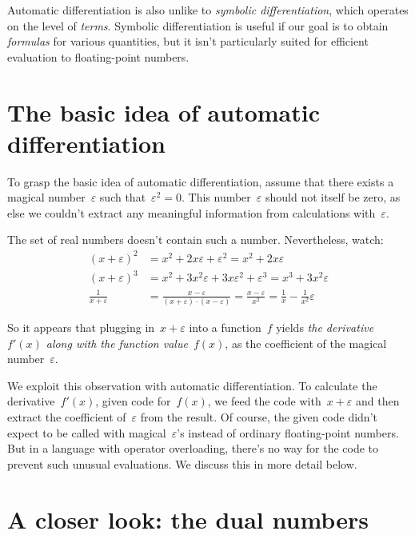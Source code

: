\documentclass[a4paper,ngerman,12pt]{scrartcl}
\theoremstyle{definition}
\theoremstyle{plain}
\theoremstyle{remark}
\begin{document}
Automatic differentiation is also unlike to \emph{symbolic differentiation},
which operates on the level of \emph{terms}. Symbolic differentiation is useful
if our goal is to obtain \emph{formulas} for various quantities, but it isn't
particularly suited for efficient evaluation to floating-point numbers.


\section{The basic idea of automatic differentiation}

To grasp the basic idea of automatic differentiation, assume that there exists
a magical number~$\varepsilon$ such that~$\varepsilon^2 = 0$. This
number~$\varepsilon$ should not itself be zero, as else we couldn't extract any
meaningful information from calculations with~$\varepsilon$.

The set of real numbers doesn't contain such a number. Nevertheless, watch:
\begin{align*}
  (x+\varepsilon)^2 &= x^2 + 2x\varepsilon + \varepsilon^2 = x^2 + 2x\varepsilon \\
  (x+\varepsilon)^3 &= x^2 + 3x^2\varepsilon + 3x\varepsilon^2 + \varepsilon^3 = x^3 + 3x^2\varepsilon \\
  \frac{1}{x+\varepsilon} &= \frac{x-\varepsilon}{(x+\varepsilon) \cdot
  (x-\varepsilon)} = \frac{x-\varepsilon}{x^2} = \frac{1}{x} - \frac{1}{x^2}
  \varepsilon
\end{align*}

So it appears that plugging in~$x + \varepsilon$ into a function~$f$ yields
\emph{the derivative~$f'(x)$ along with the function value~$f(x)$}, as the
coefficient of the magical number~$\varepsilon$.

We exploit this observation with automatic differentiation. To calculate the
derivative~$f'(x)$, given code for~$f(x)$, we feed the code with~$x +
\varepsilon$ and then extract the coefficient of~$\varepsilon$ from the result.
Of course, the given code didn't expect to be called with
magical~$\varepsilon$'s instead of ordinary floating-point numbers. But in a
language with operator overloading, there's no way for the code to prevent such
unusual evaluations. We discuss this in more detail below.


\section{A closer look: the dual numbers}
\end{document}
